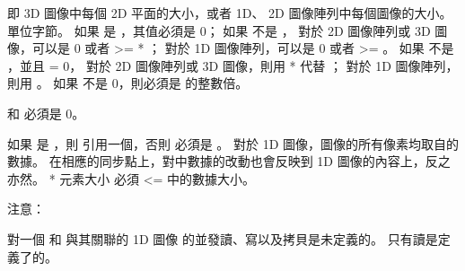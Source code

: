  即 3D 圖像中每個 2D 平面的大小，或者 1D、 2D 圖像陣列中每個圖像的大小。單位字節。
如果  是 ，其值必須是 0；
如果  不是 ，
  對於 2D 圖像陣列或 3D 圖像，可以是 0 或者 >=  * ；
  對於 1D 圖像陣列，可以是 0 或者 >= 。
如果  不是 ，並且  = 0，
  對於 2D 圖像陣列或 3D 圖像，則用  *  代替 ；
  對於 1D 圖像陣列，則用 。
如果  不是 0，則必須是  的整數倍。

 和  必須是 0。

如果  是 ，則  引用一個，否則  必須是 。
對於 1D 圖像，圖像的所有像素均取自的數據。
在相應的同步點上，對中數據的改動也會反映到 1D 圖像的內容上，反之亦然。
  * 元素大小 必須 <= 中的數據大小。

注意：

對一個 和 與其關聯的 1D 圖像 的並發讀、寫以及拷貝是未定義的。
只有讀是定義了的。


